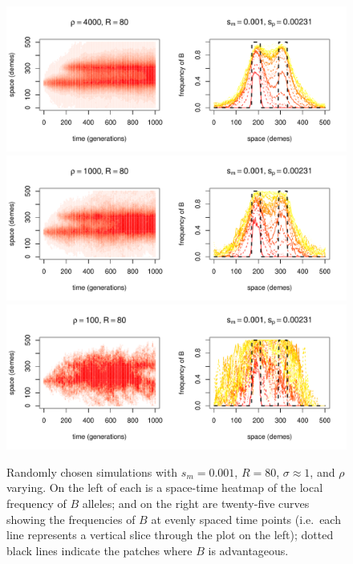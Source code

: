 \documentclass{article}
\begin{document}
\begin{figure}
  \begin{center}
    \includegraphics{example-migration-sims/88079-r1-501-sb0_01-sm-0_001-N4000-pophistory-run}
    \includegraphics{example-migration-sims/3464-r1-501-sb0_01-sm-0_001-N1000-pophistory-run}
    \includegraphics{example-migration-sims/37774-r1-501-sb0_01-sm-0_001-N100-pophistory-run}
  \end{center}
  \caption{
    Randomly chosen simulations with $s_m=0.001$, $R=80$, $\sigma\approx 1$, and $\rho$ varying.
    On the left of each is a space-time heatmap of the local frequency of $B$ alleles;
    and on the right are twenty-five curves showing the frequencies of $B$ at evenly spaced time points
    (i.e.\ each line represents a vertical slice through the plot on the left);
    dotted black lines indicate the patches where $B$ is advantageous.
  } \label{sfig:sims_7}
\end{figure}
\end{document}
